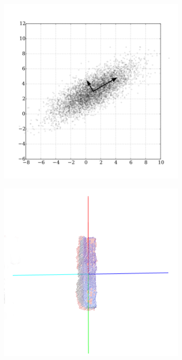 \begin{figure}[h]
\centering
\begin{subfigure}[t]{0.45\textwidth}
\includegraphics[width=\textwidth]{Img/pca/pca.png}
\caption{}\label{fig:pca1}
\end{subfigure}
\begin{subfigure}[t]{0.45\textwidth}
\includegraphics[width=\textwidth]{Img/pca/pca2.png}

\end{subfigure}
\end{figure}
